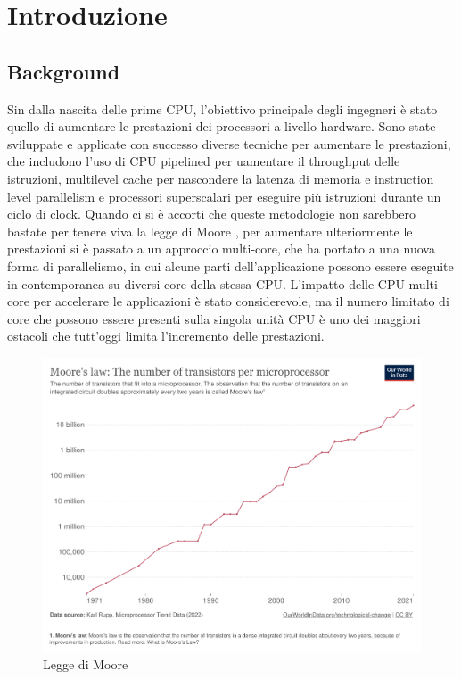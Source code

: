 \chapter{Introduzione}
\label{sec:intro}


\section[Background]{Background}

Sin dalla nascita delle prime \gls{CPU}, l'obiettivo principale degli ingegneri è stato quello di aumentare le prestazioni dei processori a livello hardware. Sono state sviluppate e applicate con successo diverse tecniche per aumentare le prestazioni, che includono l'uso di CPU pipelined per uamentare il throughput delle istruzioni, multilevel cache per nascondere la latenza di memoria e instruction level parallelism e processori superscalari per eseguire più istruzioni durante un ciclo di clock.
Quando ci si è accorti che queste metodologie non sarebbero bastate per tenere viva la legge di Moore \cite[]{Moore:law}, per aumentare ulteriormente le prestazioni si è passato a un approccio multi-core, che ha portato a una nuova forma di parallelismo, in cui alcune parti dell'applicazione possono essere eseguite in contemporanea su diversi core della stessa CPU. L'impatto delle CPU multi-core per accelerare le applicazioni è stato considerevole, ma il numero limitato di core che possono essere presenti sulla singola unità CPU è uno dei maggiori ostacoli che tutt'oggi limita l'incremento delle prestazioni.

\begin{figure}[ht]
\centering
\includegraphics[width=.9\linewidth]{images/chapter1/moore_law2.png}
\caption{Legge di Moore}
\label{fig:moore_law}
\end{figure}

